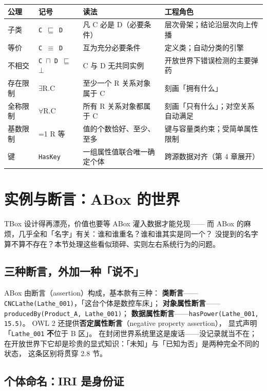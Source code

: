 \begin{center}
\begin{tabularx}{\linewidth}{@{}llXX@{}}
\toprule
\textbf{公理} & \textbf{记号} & \textbf{读法} & \textbf{工程角色} \\
\midrule
子类 & \texttt{C \(\sqsubseteq\) D} & 凡 C 必是 D（必要条件） &
层次骨架；结论沿层次向上传播 \\
等价 & \texttt{C \(\equiv\) D} & 互为充分必要条件 &
定义类；自动分类的引擎 \\
不相交 & \texttt{C \(\sqcap\) D \(\sqsubseteq\) \(\bot\)} & C 与 D 无共同实例 &
开放世界下错误检测的主要弹药 \\
存在限制 & \(\exists\)R.C & 至少一个 R 关系对象属于 C &
刻画「拥有什么」 \\
全称限制 & \(\forall\)R.C & 所有 R 关系对象都属于 C &
刻画「只有什么」；对空关系自动满足 \\
基数限制 & =1 R 等 & 值的个数恰好、至少、至多 &
键与容量类约束；受简单属性限制 \\
键 & \texttt{HasKey} & 一组属性值联合唯一确定个体 &
跨源数据对齐（第 4 章展开） \\
\bottomrule
\end{tabularx}
\end{center}

\section{实例与断言：ABox 的世界}

TBox 设计得再漂亮，价值也要等 ABox 灌入数据才能兑现——
而 ABox 的麻烦，几乎全和「名字」有关：谁和谁重名？谁和谁其实是同一个？
没提到的名字算不算不存在？本节处理这些看似琐碎、实则左右系统行为的问题。

\subsection{三种断言，外加一种「说不」}

ABox 由断言（assertion）构成，基本款有三种：
\textbf{类断言}——\texttt{CNCLathe(Lathe\_001)}，「这台个体是数控车床」；
\textbf{对象属性断言}——\texttt{producedBy(Product\_A, Lathe\_001)}；
\textbf{数据属性断言}——\texttt{hasPower(Lathe\_001, 15.5)}。
OWL 2 还提供\textbf{否定属性断言}（negative property assertion），
显式声明「\texttt{Lathe\_001} \textbf{不}位于 B 区」。
在封闭世界系统里这是废话——没记录就当不在；
在开放世界下它却是珍贵的显式知识：「未知」与「已知为否」是两种完全不同的状态，
这条区别将贯穿 2.8 节。

\subsection{个体命名：IRI 是身份证}

